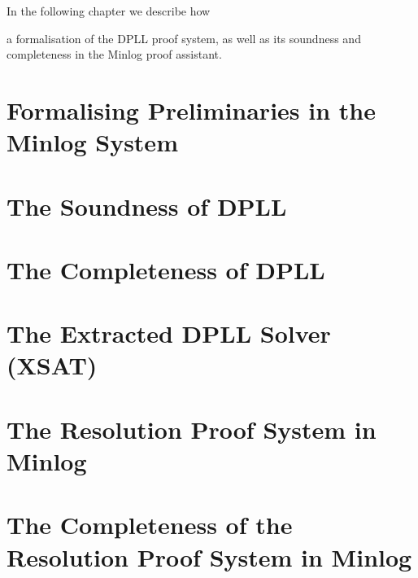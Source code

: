 In the following chapter we describe how 


a formalisation of the DPLL proof system, as well as its soundness and completeness in the Minlog proof assistant.

\section{Formalising Preliminaries in the Minlog System}

\section{The Soundness of DPLL}

\section{The Completeness of DPLL}

\section{The Extracted DPLL Solver (XSAT)}

\section{The Resolution Proof System in Minlog}

\section{The Completeness of the Resolution Proof System in Minlog}